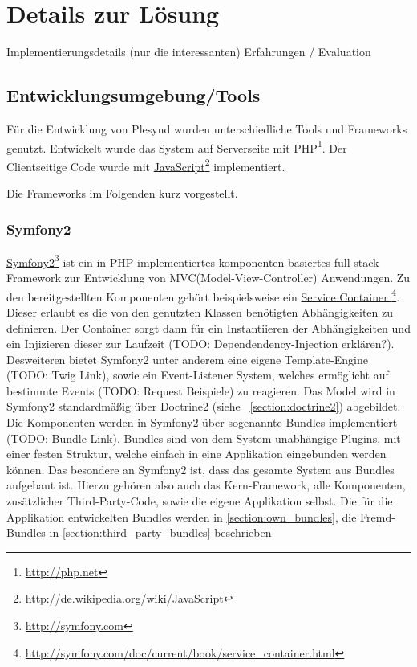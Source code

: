 \chapter{Details zur Lösung} 
\label{Kapitel 6}
Implementierungsdetails (nur die interessanten)
Erfahrungen / Evaluation

\section{Entwicklungsumgebung/Tools}
Für die Entwicklung von Plesynd wurden unterschiedliche Tools und Frameworks genutzt. Entwickelt wurde das System auf Serverseite mit \href{http://php.net}{PHP}\footnote{\url{http://php.net}}. Der Clientseitige Code wurde mit \href{http://de.wikipedia.org/wiki/JavaScript}{JavaScript}\footnote{\url{http://de.wikipedia.org/wiki/JavaScript}} implementiert. 

Die Frameworks im Folgenden kurz vorgestellt.

\subsection{Symfony2}
\href{http://symfony.com}{Symfony2}\footnote{\url{http://symfony.com}} ist ein in PHP implementiertes komponenten-basiertes full-stack Framework zur Entwicklung von MVC(Model-View-Controller) Anwendungen. Zu den bereitgestellten Komponenten gehört beispielsweise ein \href{http://symfony.com/doc/current/book/service_container.html}{Service Container }\footnote{\url{http://symfony.com/doc/current/book/service_container.html}}. Dieser erlaubt es die von den genutzten Klassen benötigten Abhängigkeiten zu definieren. Der Container sorgt dann für ein Instantiieren der Abhängigkeiten und ein Injizieren dieser zur Laufzeit (TODO: Dependendency-Injection erklären?). Desweiteren bietet Symfony2 unter anderem eine eigene Template-Engine (TODO: Twig Link), sowie ein Event-Listener System, welches ermöglicht auf bestimmte Events (TODO: Request Beispiele) zu reagieren. Das Model wird in Symfony2 standardmäßig über Doctrine2 (siehe ~\ref{section:doctrine2}) abgebildet.
Die Komponenten werden in Symfony2 über sogenannte Bundles implementiert (TODO: Bundle Link). Bundles sind von dem System unabhängige Plugins, mit einer festen Struktur, welche einfach in eine Applikation eingebunden werden können. Das besondere an Symfony2 ist, dass das gesamte System aus Bundles aufgebaut ist. Hierzu gehören also auch das Kern-Framework, alle Komponenten, zusätzlicher Third-Party-Code, sowie die eigene Applikation selbst. Die für die Applikation entwickelten Bundles werden in \ref{section:own_bundles}, die Fremd-Bundles in \ref{section:third_party_bundles} beschrieben

